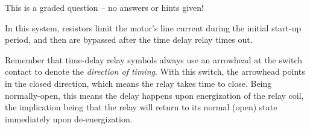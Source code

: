 This is a graded question -- no answers or hints given!
 






In this system, resistors limit the motor's line current during the initial start-up period, and then are bypassed after the time delay relay times out.  

\vskip 10pt

Remember that time-delay relay symbols always use an arrowhead at the switch contact to denote the {\it direction of timing}.  With this switch, the arrowhead points in the closed direction, which means the relay takes time to close.  Being normally-open, this means the delay happens upon energization of the relay coil, the implication being that the relay will return to its normal (open) state immediately upon de-energization.




